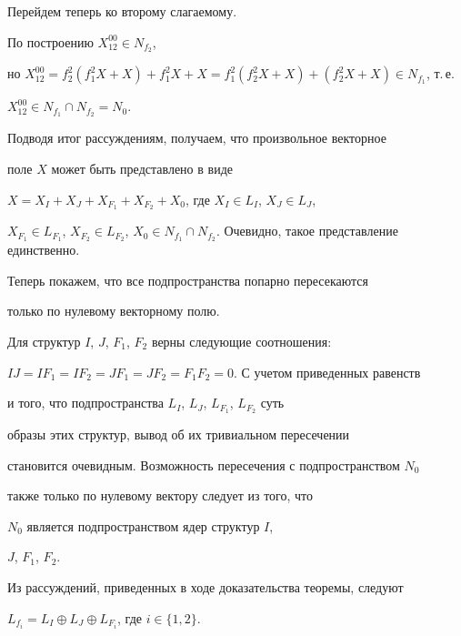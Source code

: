 \begin{pf}
Перейдем теперь ко второму слагаемому.


По построению $X_{12}^{00}\in N_{f_2}$,


но $X_{12}^{00}=f_2^2(f_1^2X+X)+f_1^2X+X=


f_1^2(f_2^2X+X)+(f_2^2X+X)\in N_{f_1}$, т.\,е.


$X_{12}^{00}\in N_{f_1}\cap N_{f_2}=N_0$.





Подводя итог рассуждениям, получаем, что произвольное векторное


поле $X$ может быть представлено в виде


$X=X_I+X_J+X_{F_1}+X_{F_2}+X_0$, где $X_I\in L_I$, $X_J\in L_J$,


$X_{F_1}\in L_{F_1}$, $X_{F_2}\in L_{F_2}$, $X_0\in N_{f_1}\cap


N_{f_2}$. Очевидно, такое представление единственно.





Теперь покажем, что все подпространства попарно пересекаются


только по нулевому векторному полю.





Для структур $I$, $J$, $F_1$, $F_2$ верны следующие соотношения:


$IJ=IF_1=IF_2=JF_1=JF_2=F_1F_2=0$. С учетом приведенных равенств


и того, что подпространства $L_I$, $L_J$, $L_{F_1}$, $L_{F_2}$ суть


образы этих структур, вывод об их тривиальном пересечении


становится очевидным. Возможность пересечения с подпространством $N_0$


также только по нулевому вектору следует из того, что


$N_0$ является подпространством ядер структур $I$,


$J$, $F_1$, $F_2$.


\end{pf}





Из рассуждений, приведенных в ходе доказательства теоремы, следуют





\begin{thm}


$L_{f_i}=L_{I}\oplus L_{J}\oplus L_{F_i}$, где $i\in\{1,2\}$.


\end{thm}






